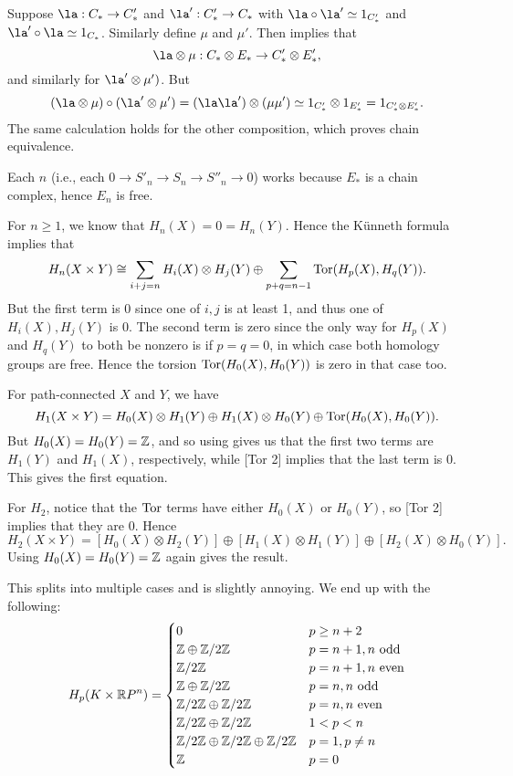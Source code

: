 \documentclass[../../solutions.tex]{subfiles}
\begin{document}
\begin{exercise} \leavevmode
Suppose $\la:C_*\to C_*'$ and $\la':C_*'\to C_*$ with $\la\circ\la'\simeq1_{C'_*}$ and $\la'\circ\la\simeq1_{C_*}$.
Similarly define $\mu$ and $\mu'$.
Then  implies that
\[\la\otimes\mu:C_*\otimes E_*\to C'_*\otimes E'_*,\]
and similarly for $\la'\otimes\mu')$.
But
\[(\la\otimes\mu)\circ(\la'\otimes\mu')=(\la\la')\otimes(\mu\mu')\simeq 1_{C'_*}\otimes 1_{E'_*}=1_{C'_*\otimes E'_*}.\]
The same calculation holds for the other composition, which proves chain equivalence.
\end{exercise}

\begin{exercise} \leavevmode
Each $n$ (i.e., each $0\to S'_n\to S_n\to S''_n\to0$) works because $E_*$ is a chain complex, hence $E_n$ is free.
\end{exercise}

\begin{exercise} \leavevmode
For $n\ge1$, we know that $H_n(X)=0=H_n(Y)$.
Hence the K\"unneth formula implies that
\[H_n(X\times Y)\cong\sum_{i+j=n}H_i(X)\otimes H_j(Y)\oplus\sum_{p+q=n-1}\operatorname{Tor}(H_p(X),H_q(Y)).\]
But the first term is 0 since one of $i,j$ is at least 1, and thus one of $H_i(X),H_j(Y)$ is 0.
The second term is zero since the only way for $H_p(X)$ and $H_q(Y)$ to both be nonzero is if $p=q=0$, in which case both homology groups are free.
Hence the torsion $\operatorname{Tor}(H_0(X),H_0(Y))$ is zero in that case too.
\end{exercise}

\begin{exercise} \leavevmode
For path-connected $X$ and $Y$, we have
\[H_1(X\times Y)=H_0(X)\otimes H_1(Y)\oplus H_1(X)\otimes H_0(Y)\oplus\operatorname{Tor}(H_0(X),H_0(Y)).\]
But $H_0(X)=H_0(Y)=\mathbb{Z}$, and so using  gives us that the first two terms are $H_1(Y)$ and $H_1(X)$, respectively, while [Tor 2] implies that the last term is 0.
This gives the first equation.

For $H_2$, notice that the $\operatorname{Tor}$ terms have either $H_0(X)$ or $H_0(Y)$, so [Tor 2] implies that they are 0.
Hence
\[H_2(X\times Y)=[H_0(X)\otimes H_2(Y)]\oplus[H_1(X)\otimes H_1(Y)]\oplus[H_2(X)\otimes H_0(Y)].\]
Using $H_0(X)=H_0(Y)=\mathbb{Z}$ again gives the result.
\end{exercise}

\begin{exercise} \leavevmode
This splits into multiple cases and is slightly annoying.
We end up with the following:
\[
H_p(K\times\mathbb{R} P^n)=
\begin{cases}
0 & p\ge n+2 \\
\mathbb{Z}\oplus\mathbb{Z}/2\mathbb{Z} & p=n+1,n~\text{odd} \\
\mathbb{Z}/2\mathbb{Z} & p=n+1,n~\text{even} \\
\mathbb{Z}\oplus\mathbb{Z}/2\mathbb{Z} & p=n,n~\text{odd} \\
\mathbb{Z}/2\mathbb{Z}\oplus\mathbb{Z}/2\mathbb{Z} & p=n,n~\text{even} \\
\mathbb{Z}/2\mathbb{Z}\oplus\mathbb{Z}/2\mathbb{Z} & 1<p<n \\
\mathbb{Z}/2\mathbb{Z}\oplus\mathbb{Z}/2\mathbb{Z}\oplus\mathbb{Z}/2\mathbb{Z} & p=1,p\ne n \\
\mathbb{Z} & p=0
\end{cases}    
\]
\end{exercise}
\end{document}
